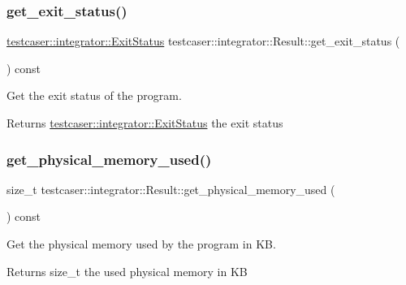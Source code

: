 \subsubsection{\texorpdfstring{get\+\_\+exit\+\_\+status()}{get\_exit\_status()}}
{\footnotesize\ttfamily \hyperlink{namespacetestcaser_1_1integrator_a68fcfdfd3f063954e9fd1a94f4b4f755}{testcaser\+::integrator\+::\+Exit\+Status} testcaser\+::integrator\+::\+Result\+::get\+\_\+exit\+\_\+status (\begin{DoxyParamCaption}{ }\end{DoxyParamCaption}) const\hspace{0.3cm}{\ttfamily [inline]}}



Get the exit status of the program. 

\begin{DoxyReturn}{Returns}
\hyperlink{namespacetestcaser_1_1integrator_a68fcfdfd3f063954e9fd1a94f4b4f755}{testcaser\+::integrator\+::\+Exit\+Status} the exit status 
\end{DoxyReturn}
\mbox{\label{classtestcaser_1_1integrator_1_1Result_a7512baef0e0dc77c8543972917852dfa}} 
\subsubsection{\texorpdfstring{get\+\_\+physical\+\_\+memory\+\_\+used()}{get\_physical\_memory\_used()}}
{\footnotesize\ttfamily size\+\_\+t testcaser\+::integrator\+::\+Result\+::get\+\_\+physical\+\_\+memory\+\_\+used (\begin{DoxyParamCaption}{ }\end{DoxyParamCaption}) const\hspace{0.3cm}{\ttfamily [inline]}}



Get the physical memory used by the program in KB. 

\begin{DoxyReturn}{Returns}
size\+\_\+t the used physical memory in KB 
\end{DoxyReturn}
\mbox{\label{classtestcaser_1_1integrator_1_1Result_a72b4929256f610e35f244412bb14b38d}} 
